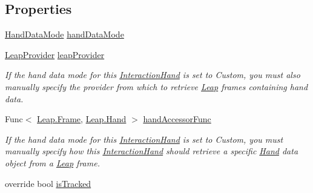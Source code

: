 \subsection*{Properties}
\begin{DoxyCompactItemize}
\item 
\mbox{\hyperlink{namespace_leap_1_1_unity_1_1_interaction_ab4a739b7f8a6748903e2ccc029df7a50}{Hand\+Data\+Mode}} \mbox{\hyperlink{class_leap_1_1_unity_1_1_interaction_1_1_interaction_hand_afa891e4ad766e5470dc8fdf0e78a7334}{hand\+Data\+Mode}}
\item 
\mbox{\hyperlink{class_leap_1_1_unity_1_1_leap_provider}{Leap\+Provider}} \mbox{\hyperlink{class_leap_1_1_unity_1_1_interaction_1_1_interaction_hand_af5d2087b092dc81bba8b6f4fae96999b}{leap\+Provider}}
\begin{DoxyCompactList}\small\item\em If the hand data mode for this \mbox{\hyperlink{class_leap_1_1_unity_1_1_interaction_1_1_interaction_hand}{Interaction\+Hand}} is set to Custom, you must also manually specify the provider from which to retrieve \mbox{\hyperlink{namespace_leap_1_1_unity_1_1_leap}{Leap}} frames containing hand data. \end{DoxyCompactList}\item 
Func$<$ \mbox{\hyperlink{class_leap_1_1_frame}{Leap.\+Frame}}, \mbox{\hyperlink{class_leap_1_1_hand}{Leap.\+Hand}} $>$ \mbox{\hyperlink{class_leap_1_1_unity_1_1_interaction_1_1_interaction_hand_a02fa026e8ea8ace2b826bbbfd10dd58f}{hand\+Accessor\+Func}}
\begin{DoxyCompactList}\small\item\em If the hand data mode for this \mbox{\hyperlink{class_leap_1_1_unity_1_1_interaction_1_1_interaction_hand}{Interaction\+Hand}} is set to Custom, you must manually specify how this \mbox{\hyperlink{class_leap_1_1_unity_1_1_interaction_1_1_interaction_hand}{Interaction\+Hand}} should retrieve a specific \mbox{\hyperlink{class_leap_1_1_hand}{Hand}} data object from a \mbox{\hyperlink{namespace_leap_1_1_unity_1_1_leap}{Leap}} frame. \end{DoxyCompactList}\item 
override bool \mbox{\hyperlink{class_leap_1_1_unity_1_1_interaction_1_1_interaction_hand_a3e4c5576bf023cf5e944e8ec2dd4d18f}{is\+Tracked}}

\end{DoxyCompactItemize}

